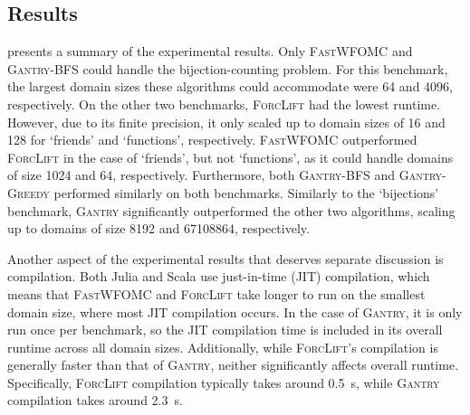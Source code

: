 \documentclass[a4paper,UKenglish,cleveref, autoref, thm-restate]{lipics-v2021}
\newcommand{\Cranetwo}{\textsc{Gantry}}
\newcommand{\Cranebfs}{\textsc{Gantry-BFS}}
\newcommand{\Cranegreedy}{\textsc{Gantry-Greedy}}
\begin{document}
\subsection{Results}




 presents a summary of the experimental results. Only
\textsc{FastWFOMC} and \Cranebfs{} could handle the bijection-counting problem.
For this benchmark, the largest domain sizes these algorithms could accommodate
were \num{64} and \num{4096}, respectively. On the other two benchmarks,
\textsc{ForcLift} had the lowest runtime. However, due to its finite precision,
it only scaled up to domain sizes of \num{16} and \num{128} for `friends' and
`functions', respectively. \textsc{FastWFOMC} outperformed \textsc{ForcLift} in
the case of `friends', but not `functions', as it could handle domains of size
\num{1024} and \num{64}, respectively. Furthermore, both \Cranebfs{} and
\Cranegreedy{} performed similarly on both benchmarks. Similarly to the
`bijections' benchmark, \Cranetwo{} significantly outperformed the other two
algorithms, scaling up to domains of size \num{8192} and \num{67108864},
respectively.

Another aspect of the experimental results that deserves separate discussion is
compilation. Both Julia and Scala use just-in-time (JIT) compilation, which
means that \textsc{FastWFOMC} and \textsc{ForcLift} take longer to run on the
smallest domain size, where most JIT compilation occurs. In the case of
\Cranetwo{}, it is only run once per benchmark, so the JIT compilation time is
included in its overall runtime across all domain sizes. Additionally, while
\textsc{ForcLift}'s compilation is generally faster than that of \Cranetwo{},
neither significantly affects overall runtime. Specifically, \textsc{ForcLift}
compilation typically takes around \SI{0.5}{\second}, while \Cranetwo{}
compilation takes around \SI{2.3}{\second}.
\end{document}
